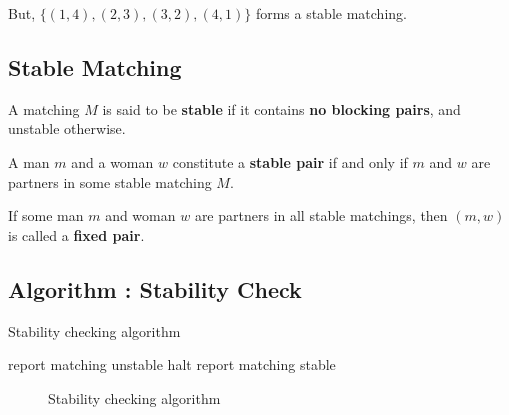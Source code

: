 But, $\{(1,4),(2,3),(3,2),(4,1)\}$ forms a stable matching.

 
\subsection{Stable Matching}
A matching $M$ is said to be \textbf{stable} if it contains \textbf{no blocking pairs}, and unstable otherwise.
 
A man $m$ and a woman $w$ constitute a \textbf{stable pair} if and only if $m$ and $w$ are partners in some stable matching $M$.
 
If some man $m$ and woman $w$ are partners in all stable matchings, then $(m, w)$ is called a \textbf{fixed pair}.
 
 

\subsection{Algorithm : Stability Check}
\begin{center}
\begin{minipage}{.7\linewidth}
\begin{algorithm}[H]
\caption{Stability checking algorithm}
\begin{algorithmic}[1]
		    \State report matching unstable
		    \State halt
		\EndIf
	\EndFor
\EndFor
\State report matching stable
\end{algorithmic}
\end{algorithm}
\end{minipage}
\begin{figure}[ht]
  \caption{Stability checking algorithm}
  \label{FIG_1_6}
\end{figure}
\end{center}
